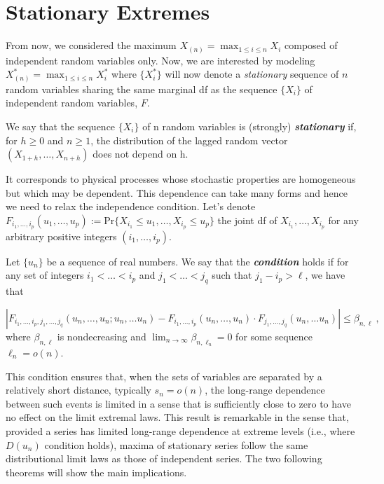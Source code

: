 \section{Stationary Extremes}\label{sec:statio}

From now, we considered the maximum $X_{(n)}=\max_{1\leq i\leq n}X_i$ composed of independent random variables only. 
 Now, we are interested by modeling 
$X^*_{(n)}=\max_{1\leq i\leq n}X^*_i$ where $\{X^*_i\}$ will now denote a \emph{stationary} 
sequence of $n$ random variables sharing the same marginal df as the sequence $\{X_i\}$ of independent random variables, $F$.

\begin{definition} We say that the sequence $\{X_i\}$ of n random variables is (strongly) \emph{\textbf{stationary}} if, for $h\geq 0$ and $n\geq 1$, the distribution of the lagged random vector $(X_{1+h},\dots,X_{n+h})$ does not depend on h.
\end{definition}
It corresponds to physical processes whose stochastic properties are homogeneous but which may be dependent. This dependence can take many forms and hence we need to relax the independence condition.
Let's denote $F_{i_1,\dots,i_p}(u_1,\dots,u_p):=\text{Pr}\{X_{i_1}\leq 
u_1,\dots,X_{i_p}\leq u_p\}$ the joint df of 
$X_{i_1},\dots,X_{i_p}$ for any arbitrary positive integers $(i_1,\dots,i_p)$.

\begin{definition} 
	Let $\{u_n\}$ be a sequence of real numbers. We say that the \emph{  \textbf{condition}} holds if for any set of integers $i_1<\dots<i_p$ and $j_1<\dots<j_q$ such that $j_1-i_p>\ell$, we have that 
	
	\begin{equation}
	|F_{i_1,\dots,i_p,j_1,\dots,j_q}(u_n,\dots,u_n;u_n,\dots u_n)-F_{i_1,\dots,i_p}(u_n,\dots,u_n)\cdot F_{j_1,\dots,j_q}(u_n,\dots u_n)|\leq \beta_{n,\ell}\ ,
	\end{equation}
	where $\beta_{n,\ell}$ is nondecreasing and  $\displaystyle{\lim_{n \to \infty}}\beta_{n,\ell_n}=0$ for some sequence $\ell_n=o(n)$.
\end{definition}
This condition ensures that, when the sets of variables are separated by a relatively short distance, typically $s_n=o(n)$, the long-range dependence between such events is limited in a sense that is sufficiently close to zero to have no effect on the limit extremal laws.
This result is remarkable in the sense that, provided a series has limited long-range dependence at extreme levels (i.e., where $D(u_n)$ condition holds), maxima of stationary series follow the same distributional limit laws as those of independent series. The two following theorems will show the main implications.


